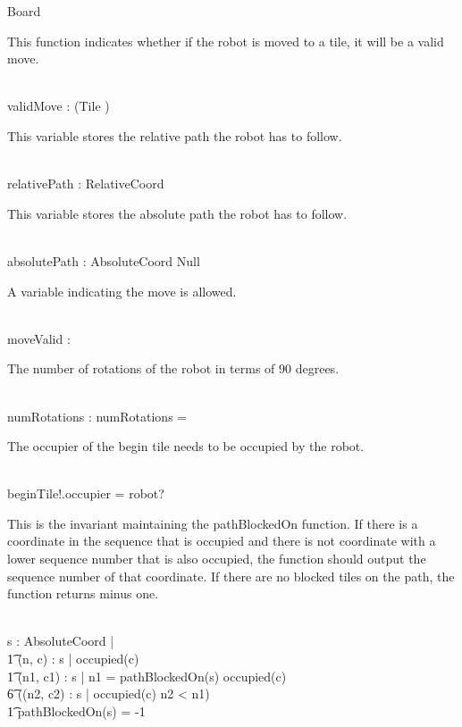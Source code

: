 \documentclass[12pt]{article}
\begin{document}
\begin{class}{Board}
\begin{nobothschema}
\begin{zpar}
This function indicates whether if the robot is moved to a tile, it will be a valid move.
\end{zpar} \\
validMove : \power (Tile \fun \bool) \\
\begin{zpar}
This variable stores the relative path the robot has to follow.
\end{zpar} \\
relativePath : \power \seq RelativeCoord\\
\begin{zpar}
This variable stores the absolute path the robot has to follow.
\end{zpar} \\
absolutePath : \power \seq AbsoluteCoord \cup Null\\
\begin{zpar}
A variable indicating the move is allowed.
\end{zpar} \\
moveValid : \bool \\
\begin{zpar}
The number of rotations of the robot in terms of 90 degrees.
\end{zpar} \\
numRotations : \nat
\where
numRotations = 
\also \also \also
\begin{zpar}
The occupier of the begin tile needs to be occupied by the robot.
\end{zpar} \\
beginTile!.occupier = robot?
\also \also \also
\begin{zpar}
This is the invariant maintaining the pathBlockedOn function. If there is a coordinate in the sequence that is occupied and there is not coordinate with a lower sequence number that is also occupied, the function should output the sequence number of that coordinate. If there are no blocked tiles on the path, the function returns minus one.
\end{zpar} \\
\forall s : \power \seq AbsoluteCoord | \\ \t1
 \IF \exists (n, c) : s | occupied(c) \\ \t1
 \THEN \exists (n1, c1) : s | n1 = pathBlockedOn(s) \wedge occupied(c) \; \; \wedge \\ \t6
 (\neg \exists (n2, c2) : s | occupied(c) \wedge n2 < n1) \\ \t1
 \ELSE pathBlockedOn(s) = -1
\also \also \also

\end{nobothschema}
\end{class}
\end{document}
